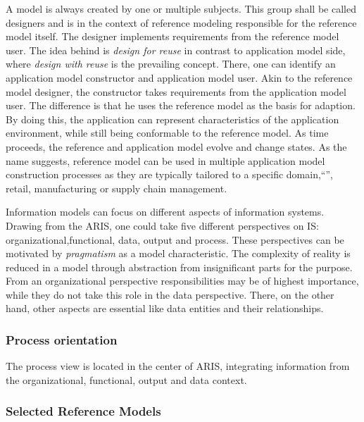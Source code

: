 		A model is always created by one or multiple subjects. This group shall be called designers and is in the context of reference modeling responsible for the reference model itself. The designer implements requirements from the reference model user. The idea behind is \textit{design for reuse} in contrast to application model side, where \textit{design with reuse} is the prevailing concept. There, one can identify an application model constructor and application model user. Akin to the reference model designer, the constructor takes requirements from the application model user. The difference is that he uses the reference model as the basis for adaption. By doing this, the application can represent characteristics of the application environment, while still being conformable to the reference model. As time proceeds, the reference and application model evolve and change states. As the name suggests, reference model can be used in multiple application model construction processes as they are typically tailored to a specific domain,\enquote{\eg}, retail, manufacturing or supply chain management.
		
		
		
		Information models can focus on different aspects of information systems. Drawing from the  \acrfull{ARIS}, one could take five different perspectives on \acrshort{IS}: organizational,functional, data, output and process. These perspectives can be motivated by \textit{pragmatism} as a model characteristic. The complexity of reality is reduced in a model through abstraction from insignificant parts for the purpose. From an organizational perspective responsibilities may be of highest importance, while they do not take this role in the data perspective. There, on the other hand, other aspects are essential like data entities and their relationships. 
		
		
		\subsubsection{Process orientation}
		 The process view is located in the center of \acrshort{ARIS}, integrating information from the organizational, functional, output and data context. 
				
	
		
		\subsubsection{Selected Reference Models}
		
